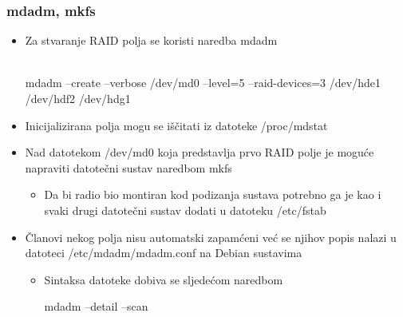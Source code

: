 \documentclass[croatian,t]{beamer} %
\begin{document}
    \begin{frame}
    \frametitle{mdadm, mkfs}
    	\begin{itemize}
    		\item Za stvaranje RAID polja se koristi naredba mdadm
    		\begin{scriptsize} \\
mdadm --create --verbose /dev/md0 --level=5  --raid-devices=3 /dev/hde1 /dev/hdf2 /dev/hdg1
			\end{scriptsize}
			\item Inicijalizirana polja mogu se iščitati iz datoteke /proc/mdstat
			\item Nad datotekom /dev/md0 koja predstavlja prvo RAID polje je moguće napraviti datotečni sustav naredbom mkfs
			\begin{itemize}
				\item Da bi radio bio montiran kod podizanja sustava potrebno ga je kao i svaki drugi datotečni sustav dodati u datoteku /etc/fstab
			\end{itemize}
			\item Članovi nekog polja nisu automatski zapamćeni već se njihov popis nalazi u datoteci /etc/mdadm/mdadm.conf na Debian sustavima
			\begin{itemize}
				\item Sintaksa datoteke dobiva se sljedećom naredbom \\
				\begin{scriptsize}
mdadm --detail --scan \\
				\end{scriptsize}
			\end{itemize}
    	\end{itemize}
    \end{frame}
    
\end{document}

